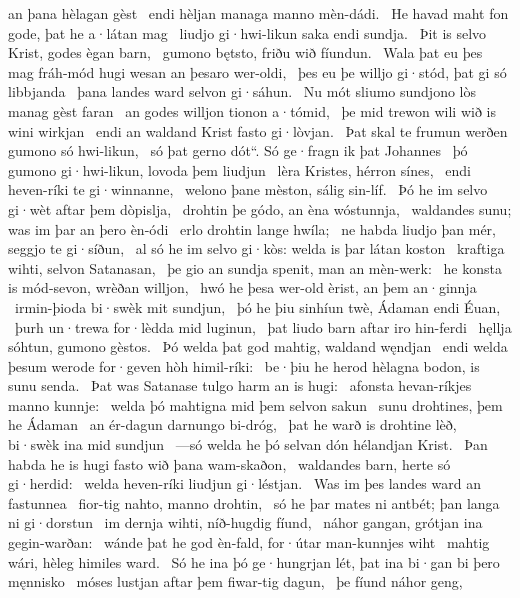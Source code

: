 an þana hèlagan gèst \hld\ endi hèljan managa %
manno mèn-dádi. \hld\ He havad maht fon gode,
þat he a·látan mag \hld\ liudjo gi·hwi-likun
saka endi sundja. \hld\ Þit is selvo Krist,
godes ègan barn, \hld\ gumono bętsto,
friðu wið fíundun. \hld\ Wala þat eu þes mag fráh-mód hugi
wesan an þesaro wer-oldi, \hld\ þes eu þe willjo gi·stód,
þat gi só libbjanda \hld\ þana landes ward
selvon gi·sáhun. \hld\ Nu mót sliumo sundjono lòs
manag gèst faran \hld\ an godes willjon
tionon a·tómid, \hld\ þe mid trewon wili
wið is wini wirkjan \hld\ endi an waldand Krist
fasto gi·lòvjan. \hld\ Þat skal te frumun werðen
gumono só hwi-likun, \hld\ só þat gerno dót“.
Só ge·fragn ik þat Johannes \hld\ þó gumono gi·hwi-likun,
lovoda þem liudjun \hld\ lèra Kristes,
hérron sínes, \hld\ endi heven-ríki
te gi·winnanne, \hld\ welono þane mèston,
sálig sin-líf. \hld\ Þó he im selvo gi·wèt
aftar þem dòpislja, \hld\ drohtin þe gódo,
an èna wóstunnja, \hld\ waldandes sunu;
was im þar an þero èn-ódi \hld\ erlo drohtin
lange hwíla; \hld\ ne habda liudjo þan mér,
seggjo te gi·síðun, \hld\ al só he im selvo gi·kòs:
welda is þar látan koston \hld\ kraftiga wihti,
selvon Satanasan, \hld\ þe gio an sundja spenit,
man an mèn-werk: \hld\ he konsta is mód-sevon,
wrèðan willjon, \hld\ hwó he þesa wer-old èrist,
an þem an·ginnja \hld\ irmin-þioda
bi·swèk mit sundjun, \hld\ þó he þiu sinhíun twè,
Ádaman endi Éuan, \hld\ þurh un·trewa
for·lèdda mid luginun, \hld\ þat liudo barn
aftar iro hin-ferdi \hld\ hęllja sóhtun,
gumono gèstos. \hld\ Þó welda þat god mahtig,
waldand węndjan \hld\ endi welda þesum werode for·geven
hòh himil-ríki: \hld\ be·þiu he herod hèlagna bodon,
is sunu senda. \hld\ Þat was Satanase
tulgo harm an is hugi: \hld\ afonsta hevan-ríkjes
manno kunnje: \hld\ welda þó mahtigna
mid þem selvon sakun \hld\ sunu drohtines,
þem he Ádaman \hld\ an ér-dagun
darnungo bi-dróg, \hld\ þat he warð is drohtine lèð,
bi·swèk ina mid sundjun \hld\ —só welda he þó selvan dón
hélandjan Krist. \hld\ Þan habda he is hugi fasto
wið þana wam-skaðon, \hld\ waldandes barn,
herte só gi·herdid: \hld\ welda heven-ríki
liudjun gi·léstjan. \hld\ Was im þes landes ward
an fastunnea \hld\ fior-tig nahto,
manno drohtin, \hld\ só he þar mates ni antbét;
þan langa ni gi·dorstun \hld\ im dernja wihti,
níð-hugdig fíund, \hld\ náhor gangan,
grótjan ina gegin-warðan: \hld\ wánde þat he god èn-fald,
for·útar man-kunnjes wiht \hld\ mahtig wári,
hèleg himiles ward. \hld\ Só he ina þó ge·hungrjan lét,
þat ina bi·gan bi þero męnnisko \hld\ móses lustjan
aftar þem fiwar-tig dagun, \hld\ þe fíund náhor geng,
